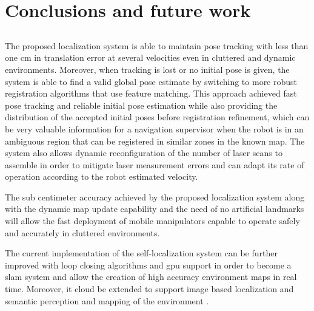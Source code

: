\chapter{Conclusions and future work} \label{chap:conclusions-and-future-work}



\section*{}

The proposed localization system is able to maintain pose tracking with less than one cm in translation error at several velocities even in cluttered and dynamic environments. Moreover, when tracking is lost or no initial pose is given, the system is able to find a valid global pose estimate by switching to more robust registration algorithms that use feature matching. This approach achieved fast pose tracking and reliable initial pose estimation while also providing the distribution of the accepted initial poses before registration refinement, which can be very valuable information for a navigation supervisor when the robot is in an ambiguous region that can be registered in similar zones in the known map. The system also allows dynamic reconfiguration of the number of laser scans to assemble in order to mitigate laser measurement errors and can adapt its rate of operation according to the robot estimated velocity.

The sub centimeter accuracy achieved by the proposed localization system along with the dynamic map update capability and the need of no artificial landmarks will allow the fast deployment of mobile manipulators capable to operate safely and accurately in cluttered environments.


The current implementation of the self-localization system can be further improved with loop closing algorithms \cite{Grisetti2012} and \gls{gpu} support \cite{Tamaki2010} in order to become a \gls{slam} system and allow the creation of high accuracy environment maps in real time. Moreover, it cloud be extended to support image based localization \cite{Labb2014} and semantic perception \cite{Rusu2010a} and mapping of the environment \cite{Santos2013}.
